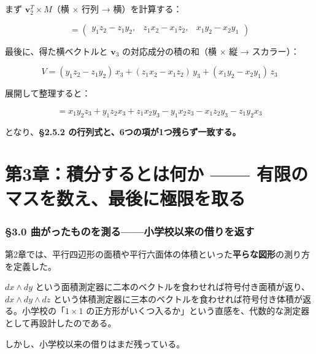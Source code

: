 \documentclass[a4paper,12pt,openany]{book}
\begin{document}
まず \(\mathbf{v}_2^T \times M\)（横 \(\times\) 行列 → 横）を計算する：

\[= \begin{pmatrix} y_1 z_2 - z_1 y_2, & z_1 x_2 - x_1 z_2, & x_1 y_2 - x_2 y_1 \end{pmatrix}\]

最後に、得た横ベクトルと \(\mathbf{v}_3\) の対応成分の積の和（横
\(\times\) 縦 → スカラー）：

\[V = (y_1 z_2 - z_1 y_2)\,x_3 + (z_1 x_2 - x_1 z_2)\,y_3 + (x_1 y_2 - x_2 y_1)\,z_3\]

展開して整理すると：

\[= x_1 y_2 z_3 + y_1 z_2 x_3 + z_1 x_2 y_3 - y_1 x_2 z_3 - x_1 z_2 y_3 - z_1 y_2 x_3\]

となり、\textbf{§2.5.2 の行列式と、6つの項が1つ残らず一致する。}

\newpage

\hypertarget{ux7b2c3ux7ae0ux7a4dux5206ux3059ux308bux3068ux306fux4f55ux304b-ux6709ux9650ux306eux30deux30b9ux3092ux6570ux3048ux6700ux5f8cux306bux6975ux9650ux3092ux53d6ux308b}{%
\chapter{第3章：積分するとは何か ——
有限のマスを数え、最後に極限を取る}\label{ux7b2c3ux7ae0ux7a4dux5206ux3059ux308bux3068ux306fux4f55ux304b-ux6709ux9650ux306eux30deux30b9ux3092ux6570ux3048ux6700ux5f8cux306bux6975ux9650ux3092ux53d6ux308b}}

\hypertarget{ux66f2ux304cux3063ux305fux3082ux306eux3092ux6e2cux308bux5c0fux5b66ux6821ux4ee5ux6765ux306eux501fux308aux3092ux8fd4ux3059}{%
\subsection{§3.0
曲がったものを測る——小学校以来の借りを返す}\label{ux66f2ux304cux3063ux305fux3082ux306eux3092ux6e2cux308bux5c0fux5b66ux6821ux4ee5ux6765ux306eux501fux308aux3092ux8fd4ux3059}}

第2章では、平行四辺形の面積や平行六面体の体積といった\textbf{平らな図形}の測り方を定義した。

\(dx \wedge dy\)
という面積測定器に二本のベクトルを食わせれば符号付き面積が返り、\(dx \wedge dy \wedge dz\)
という体積測定器に三本のベクトルを食わせれば符号付き体積が返る。小学校の「\(1 \times 1\)
の正方形がいくつ入るか」という直感を、代数的な測定器として再設計したのである。

しかし、小学校以来の借りはまだ残っている。
\end{document}
